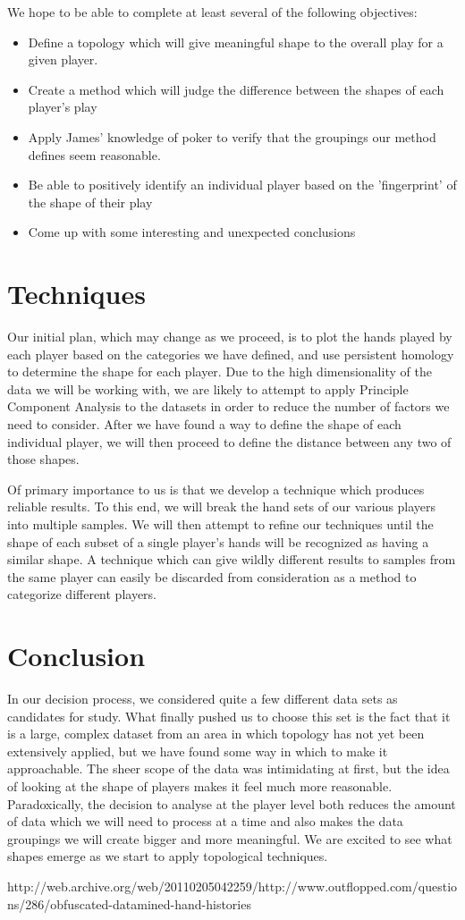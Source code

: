 \documentclass[11pt]{article}
\begin{document}
We hope to be able to complete at least several of the following objectives:

\begin{itemize}[noitemsep]
	\item Define a topology which will give meaningful shape to the overall play
	for a given player.
	\item Create a method which will judge the difference between the shapes of
	each player's play
	\item Apply James' knowledge of poker to verify that the groupings our method
	defines seem reasonable.
	\item Be able to positively identify an individual player based on the
	'fingerprint' of the shape of their play
	\item Come up with some interesting and unexpected conclusions
\end{itemize}

\section*{Techniques}
Our initial plan, which may change as we proceed, is to plot the hands played
by each player based on the categories we have defined, and use persistent
homology to determine the shape for each player. Due to the high dimensionality
of the data we will be working with, we are likely to attempt to apply Principle
Component Analysis to the datasets in order to reduce the number of factors
we need to consider. After we have found a way to define the shape of each
individual player, we will then proceed to define the distance between any
two of those shapes.

Of primary importance to us is that we develop a technique which produces
reliable results. To this end, we will break the hand sets of our various players
into multiple samples. We will then attempt to refine our techniques until the
shape of each subset of a single player's hands will be recognized as having a
similar shape. A technique which can give wildly different results to samples
from the same player can easily be discarded from consideration as a method to
categorize different players.

\section*{Conclusion}

In our decision process, we considered quite a few different data sets as
candidates for study. What finally pushed us to choose this set is the
fact that it is a large, complex dataset from an area in which topology has
not yet been extensively applied, but we have found some way in which to make
it approachable. The sheer scope of the data was intimidating at first, but
the idea of looking at the shape of players makes it feel much more reasonable.
Paradoxically, the decision to analyse at the player level both reduces the
amount of data which we will need to process at a time and also makes the
data groupings we will create bigger and more meaningful. We are excited to
see what shapes emerge as we start to apply topological techniques.

\newpage
\begin{thebibliography}{9}

  http://web.archive.org/web/20110205042259/http://www.outflopped.com/questions/286/obfuscated-datamined-hand-histories

	
\end{thebibliography}
\end{document}
